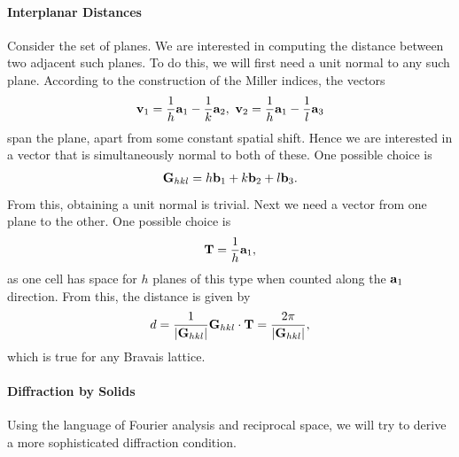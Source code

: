 \paragraph{Interplanar Distances}
Consider the set of  planes. We are interested in computing the distance between two adjacent such planes. To do this, we will first need a unit normal to any such plane. According to the construction of the Miller indices, the vectors
\begin{align*}
\vb{v}_{1} = \frac{1}{h}\vb{a}_{1} - \frac{1}{k}\vb{a}_{2},\ \vb{v}_{2} = \frac{1}{h}\vb{a}_{1} - \frac{1}{l}\vb{a}_{3}
\end{align*}
span the plane, apart from some constant spatial shift. Hence we are interested in a vector that is simultaneously normal to both of these. One possible choice is
\begin{align*}
	\vb{G}_{hkl} = h\vb{b}_{1} + k\vb{b}_{2} + l\vb{b}_{3}.
\end{align*}
From this, obtaining a unit normal is trivial. Next we need a vector from one plane to the other. One possible choice is
\begin{align*}
	\vb{T} = \frac{1}{h}\vb{a}_{1},
\end{align*}
as one cell has space for $h$ planes of this type when counted along the $\vb{a}_{1}$ direction. From this, the distance is given by
\begin{align*}
	d = \frac{1}{\abs{\vb{G}_{hkl}}}\vb{G}_{hkl}\cdot\vb{T} = \frac{2\pi}{\abs{\vb{G}_{hkl}}},
\end{align*}
which is true for any Bravais lattice.

\paragraph{Diffraction by Solids}
Using the language of Fourier analysis and reciprocal space, we will try to derive a more sophisticated diffraction condition.

